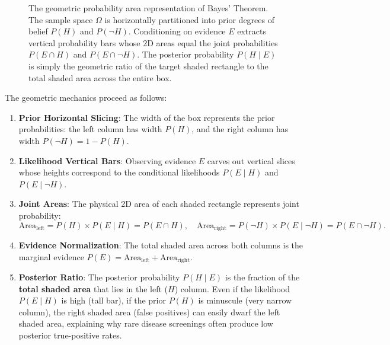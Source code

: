 \begin{figure}[htbp]
\caption{The geometric probability area representation of Bayes' Theorem. The sample space $\Omega$ is horizontally partitioned into prior degrees of belief $P(H)$ and $P(\neg H)$. Conditioning on evidence $E$ extracts vertical probability bars whose 2D areas equal the joint probabilities $P(E \cap H)$ and $P(E \cap \neg H)$. The posterior probability $P(H \mid E)$ is simply the geometric ratio of the target shaded rectangle to the total shaded area across the entire box.}
\label{fig:slide_3b1b_bayes_area}
\end{figure}

The geometric mechanics proceed as follows:
\begin{enumerate}
  \item \textbf{Prior Horizontal Slicing}: The width of the box represents the prior probabilities: the left column has width $P(H)$, and the right column has width $P(\neg H) = 1 - P(H)$.
  \item \textbf{Likelihood Vertical Bars}: Observing evidence $E$ carves out vertical slices whose heights correspond to the conditional likelihoods $P(E \mid H)$ and $P(E \mid \neg H)$.
  \item \textbf{Joint Areas}: The physical 2D area of each shaded rectangle represents joint probability:
  \begin{equation}
  \text{Area}_{\text{left}} = P(H) \times P(E \mid H) = P(E \cap H), \quad \text{Area}_{\text{right}} = P(\neg H) \times P(E \mid \neg H) = P(E \cap \neg H).
  \end{equation}
  \item \textbf{Evidence Normalization}: The total shaded area across both columns is the marginal evidence $P(E) = \text{Area}_{\text{left}} + \text{Area}_{\text{right}}$.
  \item \textbf{Posterior Ratio}: The posterior probability $P(H \mid E)$ is the fraction of the \textbf{total shaded area} that lies in the left ($H$) column. Even if the likelihood $P(E \mid H)$ is high (tall bar), if the prior $P(H)$ is minuscule (very narrow column), the right shaded area (false positives) can easily dwarf the left shaded area, explaining why rare disease screenings often produce low posterior true-positive rates.
\end{enumerate}

